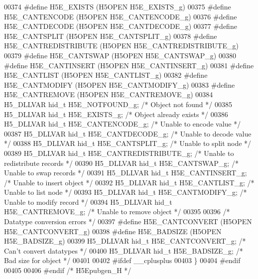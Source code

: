\begin{DoxyCode}
00374 \textcolor{preprocessor}{#define H5E\_EXISTS           (H5OPEN H5E\_EXISTS\_g)}
00375 \textcolor{preprocessor}{#define H5E\_CANTENCODE       (H5OPEN H5E\_CANTENCODE\_g)}
00376 \textcolor{preprocessor}{#define H5E\_CANTDECODE       (H5OPEN H5E\_CANTDECODE\_g)}
00377 \textcolor{preprocessor}{#define H5E\_CANTSPLIT        (H5OPEN H5E\_CANTSPLIT\_g)}
00378 \textcolor{preprocessor}{#define H5E\_CANTREDISTRIBUTE (H5OPEN H5E\_CANTREDISTRIBUTE\_g)}
00379 \textcolor{preprocessor}{#define H5E\_CANTSWAP         (H5OPEN H5E\_CANTSWAP\_g)}
00380 \textcolor{preprocessor}{#define H5E\_CANTINSERT       (H5OPEN H5E\_CANTINSERT\_g)}
00381 \textcolor{preprocessor}{#define H5E\_CANTLIST         (H5OPEN H5E\_CANTLIST\_g)}
00382 \textcolor{preprocessor}{#define H5E\_CANTMODIFY       (H5OPEN H5E\_CANTMODIFY\_g)}
00383 \textcolor{preprocessor}{#define H5E\_CANTREMOVE       (H5OPEN H5E\_CANTREMOVE\_g)}
00384 H5\_DLLVAR hid\_t H5E\_NOTFOUND\_g;      \textcolor{comment}{/* Object not found */}
00385 H5\_DLLVAR hid\_t H5E\_EXISTS\_g;        \textcolor{comment}{/* Object already exists */}
00386 H5\_DLLVAR hid\_t H5E\_CANTENCODE\_g;    \textcolor{comment}{/* Unable to encode value */}
00387 H5\_DLLVAR hid\_t H5E\_CANTDECODE\_g;    \textcolor{comment}{/* Unable to decode value */}
00388 H5\_DLLVAR hid\_t H5E\_CANTSPLIT\_g;     \textcolor{comment}{/* Unable to split node */}
00389 H5\_DLLVAR hid\_t H5E\_CANTREDISTRIBUTE\_g; \textcolor{comment}{/* Unable to redistribute records */}
00390 H5\_DLLVAR hid\_t H5E\_CANTSWAP\_g;      \textcolor{comment}{/* Unable to swap records */}
00391 H5\_DLLVAR hid\_t H5E\_CANTINSERT\_g;    \textcolor{comment}{/* Unable to insert object */}
00392 H5\_DLLVAR hid\_t H5E\_CANTLIST\_g;      \textcolor{comment}{/* Unable to list node */}
00393 H5\_DLLVAR hid\_t H5E\_CANTMODIFY\_g;    \textcolor{comment}{/* Unable to modify record */}
00394 H5\_DLLVAR hid\_t H5E\_CANTREMOVE\_g;    \textcolor{comment}{/* Unable to remove object */}
00395 
00396 \textcolor{comment}{/* Datatype conversion errors */}
00397 \textcolor{preprocessor}{#define H5E\_CANTCONVERT      (H5OPEN H5E\_CANTCONVERT\_g)}
00398 \textcolor{preprocessor}{#define H5E\_BADSIZE          (H5OPEN H5E\_BADSIZE\_g)}
00399 H5\_DLLVAR hid\_t H5E\_CANTCONVERT\_g;   \textcolor{comment}{/* Can't convert datatypes */}
00400 H5\_DLLVAR hid\_t H5E\_BADSIZE\_g;       \textcolor{comment}{/* Bad size for object */}
00401 
00402 \textcolor{preprocessor}{#ifdef \_\_cplusplus}
00403 \}
00404 \textcolor{preprocessor}{#endif}
00405 
00406 \textcolor{preprocessor}{#endif }\textcolor{comment}{/* H5Epubgen\_H */}\textcolor{preprocessor}{}
\end{DoxyCode}
